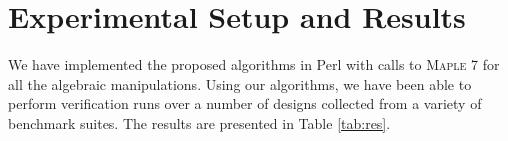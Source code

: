 
\section{Experimental Setup and Results} \label{sec:expt}

We have implemented the proposed algorithms in Perl with calls to
\textsc{Maple} 7 \cite{Maple} for all the algebraic
manipulations. Using our algorithms, we have been able to perform
verification runs over a number of designs collected from a variety of
benchmark suites. The results are presented in Table \ref{tab:res}.

